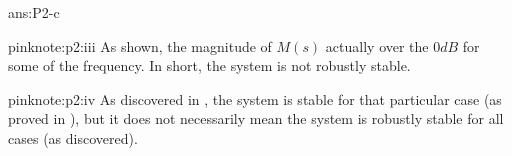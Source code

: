 \documentclass{tron}
\begin{document}
\begin{answer}{ans:P2-c}
\begin{note}{pink}{note:p2:iii}
		As  shown, the magnitude of $M(s)$ actually over the $0 \unit{dB}$ for some of the frequency. In short, the system is not robustly stable.
	\end{note}

	\begin{note}{pink}{note:p2:iv}
		As discovered in , the system is stable for that particular case (as proved in ), but it does not necessarily mean the system is robustly stable for all cases (as  discovered). 
	\end{note}

\end{answer}






\clearpage
\printglossaries


\end{document}
